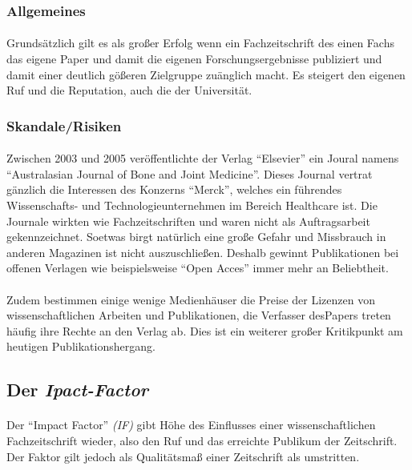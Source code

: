 \documentclass[10pt, a4paper]{article}
\begin{document}
\subsubsection{Allgemeines}
\paragraph{}
Grundsätzlich gilt es als großer Erfolg wenn ein Fachzeitschrift des einen Fachs das eigene Paper und damit die eigenen Forschungsergebnisse publiziert und damit einer deutlich gößeren Zielgruppe zuänglich macht. Es steigert den eigenen Ruf und die Reputation, auch die der Universität.\par
\subsubsection{Skandale/Risiken}
\paragraph{}
Zwischen 2003 und 2005 veröffentlichte der Verlag \enquote{Elsevier} ein Joural namens \enquote{Australasian Journal of Bone and Joint Medicine}. Dieses Journal vertrat gänzlich die Interessen des Konzerns \enquote{Merck}, welches ein führendes Wissenschafts- und Technologieunternehmen im Bereich Healthcare ist. Die Journale wirkten wie Fachzeitschriften und waren nicht als Auftragsarbeit gekennzeichnet.
Soetwas birgt natürlich eine große Gefahr und Missbrauch in anderen Magazinen ist nicht auszuschließen. Deshalb gewinnt Publikationen bei offenen Verlagen wie beispielsweise \enquote{Open Acces} immer mehr an Beliebtheit.
\par
\paragraph{}
Zudem bestimmen einige wenige Medienhäuser die Preise der Lizenzen von wissenschaftlichen Arbeiten und Publikationen, die Verfasser desPapers treten häufig ihre Rechte an den Verlag ab. Dies ist ein weiterer großer Kritikpunkt am heutigen Publikationshergang. \par

\subsection{Der \textit{Ipact-Factor}}
\paragraph{}
Der \enquote{Impact Factor} \textit{(IF)} gibt Höhe des Einflusses einer wissenschaftlichen Fachzeitschrift wieder, also den Ruf und das erreichte Publikum der Zeitschrift. Der Faktor gilt jedoch als Qualitätsmaß einer Zeitschrift als umstritten.\par
\end{document}

